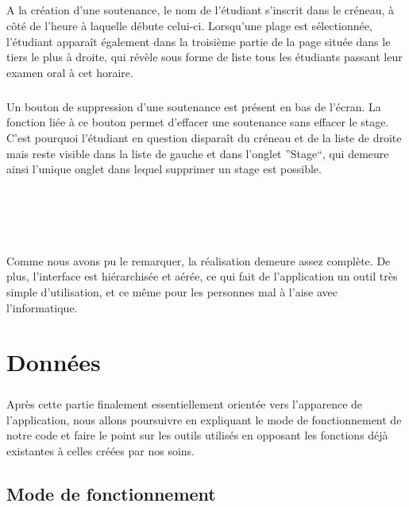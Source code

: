 \documentclass[a4paper,10pt]{report}
\begin{document}
		\paragraph{}
		  A la création d'une soutenance, le nom de l'étudiant s'inscrit dans le créneau, à côté de l'heure à laquelle débute celui-ci.
		  Lorsqu'une plage est sélectionnée, l'étudiant apparaît également dans la troisième partie de la page située dans le tiers le plus à droite, qui révèle sous forme de liste tous les étudiants passant leur examen oral à cet horaire.
		  
		\paragraph{}
		  Un bouton de suppression d'une soutenance est présent en bas de l'écran.
		  La fonction liée à ce bouton permet d'effacer une soutenance sans effacer le stage.
		  C'est pourquoi l'étudiant en question disparaît du créneau et de la liste de droite mais reste visible dans la liste de gauche et dans l'onglet ''Stage``, qui demeure ainsi l'unique onglet dans lequel supprimer un stage est possible.
		 
		 ~\\
		 ~\\
		 ~\\
		\paragraph{}
		  Comme nous avons pu le remarquer, la réalisation demeure assez complète.
		  De plus, l'interface est hiérarchisée et aérée, ce qui fait de l'application un outil très simple d'utilisation, et ce même pour les personnes mal à l'aise avec l'informatique.
		  
  \chapter{Données}
      \paragraph{}
	Après cette partie finalement essentiellement orientée vers l'apparence de l'application, nous allons poursuivre en expliquant le mode de fonctionnement de notre code et faire le point sur les outils utilisés en opposant les fonctions déjà existantes à celles créées par nos soins.
		   
    \section{Mode de fonctionnement}
\end{document}
